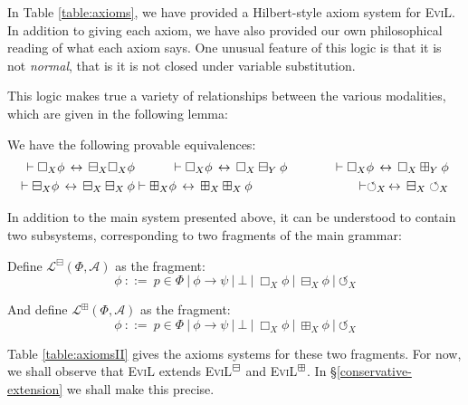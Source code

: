 In Table \ref{table:axioms}, we have provided a Hilbert-style axiom system for \textsc{EviL}.  In addition to giving each axiom, we have also provided our own philosophical reading of what each axiom says.  One unusual feature of this logic is that it is not \emph{normal}, that is it is not closed under variable substitution.



This logic makes true a variety of relationships between the various
modalities, which are given in the following lemma:
\begin{lemma}\label{equivs}
We have the following provable equivalences:
\begin{eqnarray*} \vdash \Box_X \phi \,\leftrightarrow\, \boxminus_X \Box_X \phi & \hspace{1cm} \vdash \Box_X \phi \,\leftrightarrow\, \Box_X \boxminus_Y \phi \hspace{1cm}  & \vdash \Box_X \phi \,\leftrightarrow\, \Box_X \boxplus_Y \phi \\
 \vdash \boxminus_X \phi \,\leftrightarrow\, \boxminus_X \boxminus_X \phi & \vdash \boxplus_X \phi \,\leftrightarrow\, \boxplus_X \boxplus_X \phi & \vdash \circlearrowleft_X \,\leftrightarrow\, \boxminus_X \circlearrowleft_X\end{eqnarray*}
\end{lemma}

In addition to the main system presented above, it can be understood to contain two subsystems, corresponding to two fragments of the main grammar:
\begin{definition}
Define $\mathcal{L}^\boxminus (\Phi, \mathcal{A})$ as the fragment:
\[ \phi \ {::=} \  p \in \Phi \  | \  \phi
   \rightarrow \psi \  | \  \bot \  |
   \  \Box_X \phi \  | \  \boxminus_X \phi
 \  | \ 
   \circlearrowleft_X \]

And define $\mathcal{L}^\boxplus (\Phi, \mathcal{A})$ as the fragment:
\[ \phi \ {::=} \  p \in \Phi \  | \  \phi
   \rightarrow \psi \  | \  \bot \  |
   \  \Box_X \phi 
   \  | \  \boxplus_X \phi
 \  | \ 
   \circlearrowleft_X \]
\end{definition}

Table \ref{table:axiomsII} gives the axioms systems for these two fragments.  For now, we shall observe that \textsc{EviL} extends \textsc{EviL}$^\boxminus$ and \textsc{EviL}$^\boxplus$.  In \S\ref{conservative-extension} we shall make this precise. 


